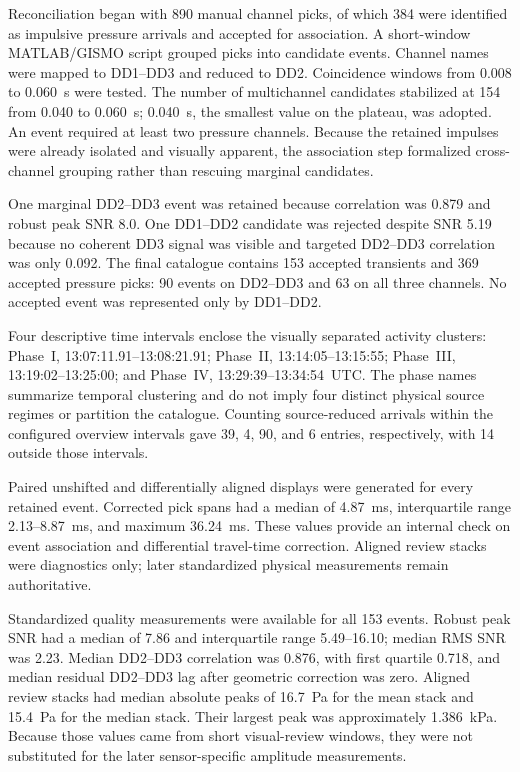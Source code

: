 \documentclass[]{seismica}
\begin{document}
Reconciliation began with 890 manual channel picks, of which 384 were
identified as impulsive pressure arrivals and accepted for association. A short-window MATLAB/GISMO script
\citep{thompson_gismo_2017} grouped picks into candidate events. Channel names
were mapped to DD1--DD3 and reduced to
DD2. Coincidence windows from 0.008 to 0.060~s were tested. The number of
multichannel candidates stabilized at 154 from 0.040 to 0.060~s; 0.040~s, the
smallest value on the plateau, was adopted. An event required at least two
pressure channels. Because the retained impulses were already isolated and
visually apparent, the association step formalized cross-channel grouping
rather than rescuing marginal candidates.

One marginal DD2--DD3 event was retained because correlation was 0.879 and
robust peak SNR 8.0. One DD1--DD2 candidate was rejected despite SNR 5.19
because no coherent DD3 signal was visible and targeted DD2--DD3 correlation
was only 0.092. The final catalogue contains 153 accepted transients and 369
accepted pressure picks: 90 events on DD2--DD3 and 63 on all three channels.
No accepted event was represented only by DD1--DD2.

Four descriptive time intervals enclose the visually separated activity
clusters: Phase~I, 13:07:11.91--13:08:21.91; Phase~II,
13:14:05--13:15:55; Phase~III, 13:19:02--13:25:00; and Phase~IV,
13:29:39--13:34:54~UTC. The phase names summarize temporal clustering and do
not imply four distinct physical source regimes or partition the catalogue.
Counting source-reduced arrivals within the configured overview intervals
gave 39, 4, 90, and 6 entries, respectively, with 14 outside those intervals.

Paired unshifted and differentially aligned displays were generated for every
retained event. Corrected pick spans had a median of 4.87~ms, interquartile
range 2.13--8.87~ms, and maximum 36.24~ms. These values provide an internal
check on event association and differential travel-time correction. Aligned
review stacks were diagnostics only; later standardized physical measurements
remain authoritative.

Standardized quality measurements were available for all 153 events. Robust
peak SNR had a median of 7.86 and interquartile range 5.49--16.10; median RMS
SNR was 2.23. Median DD2--DD3 correlation was 0.876, with first quartile
0.718, and median residual DD2--DD3 lag after geometric correction was zero.
Aligned review stacks had median absolute peaks of 16.7~Pa for the mean stack
and 15.4~Pa for the median stack. Their largest peak was approximately
1.386~kPa. Because those values came from short visual-review windows, they
were not substituted for the later sensor-specific amplitude measurements.
\end{document}
